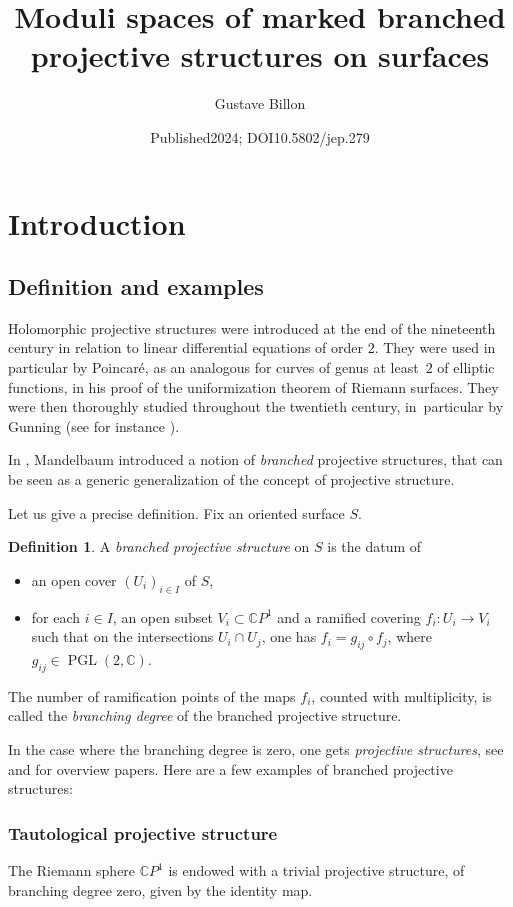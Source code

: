\documentclass[10pt]{amsart}
\title[Moduli of marked branched projective structures]{Moduli spaces of marked branched projective structures on surfaces}
\author{Gustave Billon}
\date{Published2024; DOI10.5802/jep.279}
\newcommand{\C}{\mathbb C}
\newcommand{\CP}{\mathbb CP}
\DeclareMathOperator{\PGL}{PGL}
\theoremstyle{definition}
\newtheorem*{definition*}{Definition}
\theoremstyle{plain}
\begin{document}
\maketitle
\section*{Introduction}

\subsection*{Definition and examples}

Holomorphic projective structures were introduced at the end of the nineteenth century in relation to linear differential equations of order $2$. They were used in particular by Poincaré, as an analogous for curves of genus at least~$2$ of elliptic functions, in his proof of the uniformization theorem of Riemann surfaces.
They were then thoroughly studied throughout the twentieth century, in~particular by Gunning (see for instance \cite{gunning}).

In \cite{mandelbaum_1}, Mandelbaum introduced a notion of \emph{branched} projective structures, that can be seen as a generic generalization of the concept of projective structure.

Let us give a precise definition.
Fix an oriented surface $S$.\enlargethispage{\baselineskip}%

\begin{definition*}
A \emph{branched projective structure} on $S$ is the datum of
\begin{itemize}
\item an open cover $(U_i)_{i \in I}$ of $S$,
\item for each $i \in I$, an open subset $V_i \subset \CP^1$ and a ramified covering $f_i: U_i \to V_i$ such that on the intersections $U_i \cap U_j$, one has $f_i = g_{ij} \circ f_j$, where $g_{ij} \in \PGL(2, \C)$.
\end{itemize}
The number of ramification points of the maps $f_i$, counted with multiplicity, is called the \emph{branching degree} of the branched projective structure.
\end{definition*}

In the case where the branching degree is zero, one gets \emph{projective structures}, see \cite{dumas} and \cite{loray-marin} for overview papers.
Here are a few examples of branched projective structures:

\subsubsection*{Tautological projective structure}
The Riemann sphere $\CP^1$ is endowed with a trivial projective structure, of branching degree zero, given by the identity map.
\end{document}
